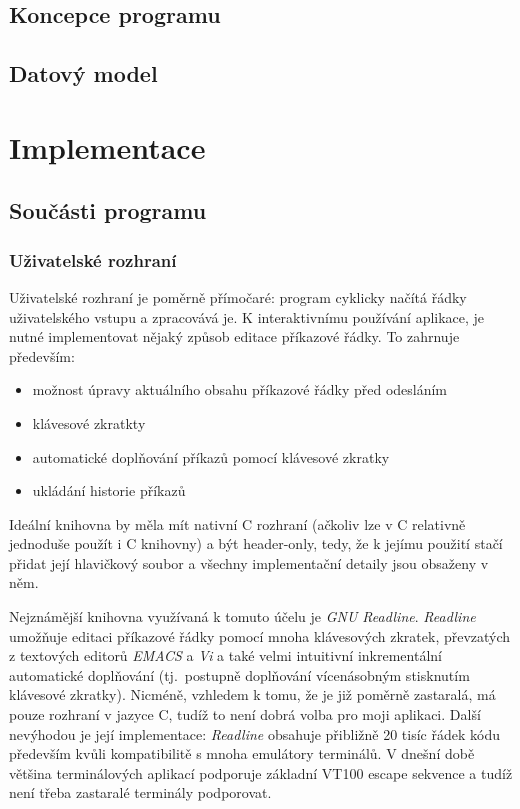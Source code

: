 \documentclass[thesis=B,czech]{FITthesis}[2019/03/06]
\newcommand{\Rplus}{\protect\hspace{-.1em}\protect\raisebox{.35ex}{\smaller{\smaller\textbf{+}}}}
\newcommand{\Cpp}{\mbox{C\Rplus\Rplus}\xspace}
\begin{document}
\section{Koncepce programu}

\section{Datový model}


\chapter{Implementace}

\section{Součásti programu}

\subsection{Uživatelské rozhraní}
Uživatelské rozhraní je poměrně přímočaré: program cyklicky načítá řádky uživatelského vstupu a zpracovává je. K interaktivnímu používání aplikace, je nutné implementovat nějaký způsob editace příkazové řádky. To zahrnuje především:
\begin{itemize}
\item možnost úpravy aktuálního obsahu příkazové řádky před odesláním
\item klávesové zkratkty 
\item automatické doplňování příkazů pomocí klávesové zkratky
\item ukládání historie příkazů
\end{itemize}
Ideální knihovna by měla mít nativní \Cpp{} rozhraní (ačkoliv lze v \Cpp{} relativně jednoduše použít i C knihovny) a být header-only, tedy, že k jejímu použití stačí přidat její hlavičkový soubor a všechny implementační detaily jsou obsaženy v něm.

Nejznámější knihovna využívaná k tomuto účelu je \textit{GNU Readline}. \textit{Readline} umožňuje editaci příkazové řádky pomocí mnoha klávesových zkratek, převzatých z textových editorů \textit{EMACS} a \textit{Vi} a také velmi intuitivní inkrementální automatické doplňování (tj.\ postupně doplňování vícenásobným stisknutím klávesové zkratky). Nicméně, vzhledem k tomu, že je již poměrně zastaralá, má pouze rozhraní v jazyce C, tudíž to není dobrá volba pro moji aplikaci. Další nevýhodou je její implementace: \textit{Readline} obsahuje přibližně 20 tisíc řádek kódu především kvůli kompatibilitě s mnoha emulátory terminálů. V dnešní době většina terminálových aplikací podporuje základní VT100 escape sekvence a tudíž není třeba zastaralé terminály podporovat.
\end{document}
